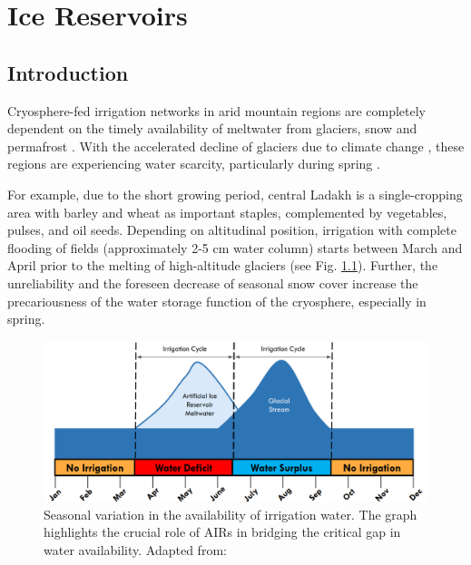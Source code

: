 \chapter{Ice Reservoirs}


\section{Introduction}

Cryosphere-fed irrigation networks in arid mountain regions are completely dependent on the timely availability
of meltwater from glaciers, snow and permafrost \citep{immerzeelImportanceVulnerabilityWorld2020,
farhanHydrologicalRegimesConjunction2015, tveitenGlacierGrowingLocal2007}. With the accelerated decline of
glaciers due to climate change \citep{nusserLocalKnowledgeGlobal2016}, these regions are experiencing water
scarcity, particularly during spring \citep{norphelSnowWaterHarvesting2015,
mukhopadhyayReevaluationSnowmeltGlacial2015}.



For example, due to the short growing period, central Ladakh is a single-cropping area with barley and wheat as
important staples, complemented by vegetables, pulses, and oil seeds. Depending on altitudinal position,
irrigation with complete flooding of fields (approximately 2-5 cm water column) starts between March and April
prior to the melting of high-altitude glaciers \citep{nusserSociohydrologyArtificialGlaciers2019} (see Fig.
\ref{fig:irrigation_cycles}). Further, the unreliability and the foreseen decrease of seasonal snow cover
\citep{chevuturiClimateChangeLeh2018} increase the precariousness of the water storage function of the
cryosphere, especially in spring.

\begin{figure}[htb]
\centering
\includegraphics[width=12cm]{figs/irrigation_cycles.png}
\caption{Seasonal variation in the availability of irrigation water. The graph highlights the crucial role of
AIRs in bridging the critical gap in water availability. Adapted from: \cite{nusserLocalKnowledgeGlobal2016}}
\label{fig:irrigation_cycles}
\end{figure}

